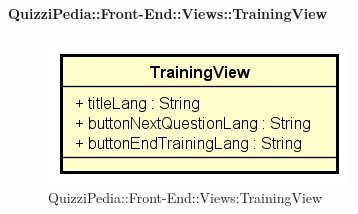 \paragraph{QuizziPedia::Front-End::Views::TrainingView}
\begin{figure} [ht]
	\centering
	\includegraphics[scale=0.80]{UML/Classi/Front-End/QuizziPedia_Front-end_TrainingView.png}
	\caption{QuizziPedia::Front-End::Views:TrainingView}
\end{figure} \FloatBarrier
